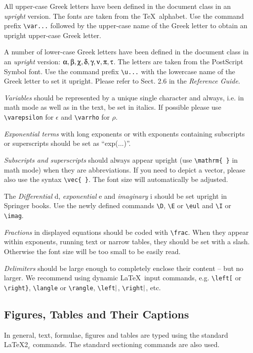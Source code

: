 \documentclass[graybox]{svmono}
\begin{document}
All upper-case Greek letters have been defined in the document class in an {\it upright} version. The fonts are taken from the \TeX~alphabet. Use the command prefix \verb|\var...| followed by the upper-case name of the Greek letter to obtain an upright upper-case Greek letter.

A number of lower-case Greek letters have been defined in the document class in an {\it upright} version: $\ualpha, \ubeta, \uchi, \udelta, \ugamma, \unu, \upi, \utau$. The letters are taken from the PostScript Symbol font. Use the command prefix \verb|\u...| with the lower­case name of the Greek letter to set it upright. Please refer to Sect. 2.6 in the {\it Reference Guide}.

{\it Variables} should be represented by a unique single character and always, i.e. in math mode as well as in the text, be set in italics. If possible please use \verb|\varepsilon| for $\epsilon$ and \verb|\varrho| for $\rho$.

{\it Exponential terms} with long exponents or with exponents containing subscripts or superscripts should be set as ``exp(...)''.

{\it Subscripts and superscripts} should always appear upright (use \verb|\mathrm{ }| in math mode) when they are abbreviations. If you need to depict a vector, please also use the syntax \verb|\vec{ }|. The font size will automatically be adjusted.

The {\it Differential} d, {\it exponential} e and {\it imaginary} i should be set upright in Springer books. Use the newly defined commands \verb|\D|, \verb|\E| or \verb|\eul| and \verb|\I| or \verb|\imag|.

{\it Fractions} in displayed equations should be coded with \verb|\frac|. When they appear within exponents, running text or narrow tables, they should be set with a slash. Otherwise the font size will be too small to be easily read.

{\it Delimiters} should be large enough to completely enclose their content -- but no larger. We recommend using dynamic \LaTeX~input commands, e.g. \verb|\left[| or \verb|\right}|, \verb|\langle| or \verb|\rangle|, \verb|\left|${\tt \vert}$, \verb|\right|${\tt \vert}$, etc.


\subsection{Figures, Tables and Their Captions}

In general, text, formulae, figures and tables are typed using the standard \LaTeX2$_\varepsilon$ commands. The standard sectioning commands are also used.
\end{document}

